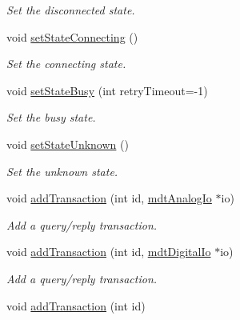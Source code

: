 \begin{DoxyCompactItemize}
\begin{DoxyCompactList}\small\item\em Set the disconnected state. \end{DoxyCompactList}\item 
void \hyperlink{classmdt_device_afe240d2bb42c13182ea3b1b5deff006b}{setStateConnecting} ()
\begin{DoxyCompactList}\small\item\em Set the connecting state. \end{DoxyCompactList}\item 
void \hyperlink{classmdt_device_abf01ab213b91df9ff03ad6b7184abf88}{setStateBusy} (int retryTimeout=-\/1)
\begin{DoxyCompactList}\small\item\em Set the busy state. \end{DoxyCompactList}\item 
void \hyperlink{classmdt_device_a312bf413dfc16765328843f3fe08a4b8}{setStateUnknown} ()
\begin{DoxyCompactList}\small\item\em Set the unknown state. \end{DoxyCompactList}\item 
\hypertarget{classmdt_device_a152a866615b291d0344f24948141f9dd}{
void \hyperlink{classmdt_device_a152a866615b291d0344f24948141f9dd}{addTransaction} (int id, \hyperlink{classmdt_analog_io}{mdtAnalogIo} $\ast$io)}
\label{classmdt_device_a152a866615b291d0344f24948141f9dd}

\begin{DoxyCompactList}\small\item\em Add a query/reply transaction. \end{DoxyCompactList}\item 
\hypertarget{classmdt_device_ab7fc34f881527ded34d692da29431f85}{
void \hyperlink{classmdt_device_ab7fc34f881527ded34d692da29431f85}{addTransaction} (int id, \hyperlink{classmdt_digital_io}{mdtDigitalIo} $\ast$io)}
\label{classmdt_device_ab7fc34f881527ded34d692da29431f85}

\begin{DoxyCompactList}\small\item\em Add a query/reply transaction. \end{DoxyCompactList}\item 
\hypertarget{classmdt_device_aebee51bc9e2cbbef1614df8218be1fcd}{
void \hyperlink{classmdt_device_aebee51bc9e2cbbef1614df8218be1fcd}{addTransaction} (int id)}
\label{classmdt_device_aebee51bc9e2cbbef1614df8218be1fcd}


\end{DoxyCompactItemize}
